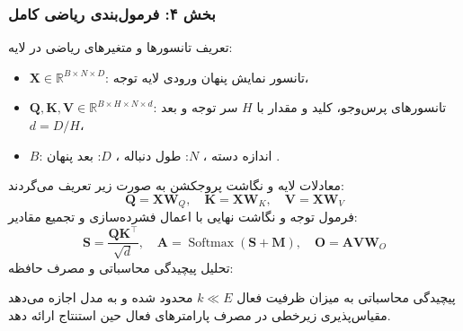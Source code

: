 \subsubsection*{بخش ۴: فرمول‌بندی ریاضی کامل }
تعریف تانسورها و متغیرهای ریاضی در لایه:
\begin{itemize}
    \item $\mathbf{X} \in \mathbb{R}^{B \times N \times D}$: تانسور نمایش پنهان ورودی لایه توجه،
    \item $\mathbf{Q}, \mathbf{K}, \mathbf{V} \in \mathbb{R}^{B \times H \times N \times d}$: تانسورهای پرس‌وجو، کلید و مقدار با $H$ سر توجه و بعد $d = D/H$،
    \item $B$: اندازه دسته ، $N$: طول دنباله ، $D$: بعد پنهان .
\end{itemize}
معادلات لایه و نگاشت پروجکشن به صورت زیر تعریف می‌گردند:
\begin{equation}
\mathbf{Q} = \mathbf{X} \mathbf{W}_Q, \quad \mathbf{K} = \mathbf{X} \mathbf{W}_K, \quad \mathbf{V} = \mathbf{X} \mathbf{W}_V
\end{equation}
فرمول توجه و نگاشت نهایی با اعمال فشرده‌سازی و تجمیع مقادیر:
\begin{equation}
\mathbf{S} = \frac{\mathbf{Q} \mathbf{K}^\top}{\sqrt{d}}, \quad \mathbf{A} = \operatorname{Softmax}\left( \mathbf{S} + \mathbf{M} \right), \quad \mathbf{O} = \mathbf{A} \mathbf{V} \mathbf{W}_O
\end{equation}
تحلیل پیچیدگی محاسباتی و مصرف حافظه:

پیچیدگی محاسباتی به میزان ظرفیت فعال $k \ll E$ محدود شده و به مدل اجازه می‌دهد مقیاس‌پذیری زیرخطی در مصرف پارامترهای فعال حین استنتاج ارائه دهد.

